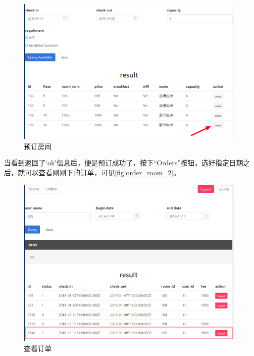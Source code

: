 \documentclass{myreport}
\begin{document}
\begin{figure}[htp]
    \centering
    \includegraphics[width=15cm]{figure/2018-12-22-15-15-10.png}
    \caption{预订房间}
    \label{fig:order_room_1}
\end{figure}

当看到返回了‘ok’信息后，便是预订成功了，按下“Orders”按钮，选好指定日期之后，就可以查看刚刚下的订单，可见\autoref{fig:order_room_2}。

\begin{figure}[htp]
    \centering
    \includegraphics[width=15cm]{figure/2018-12-22-15-30-21.png}
    \caption{查看订单}
    \label{fig:order_room_2}
\end{figure}
\end{document}
